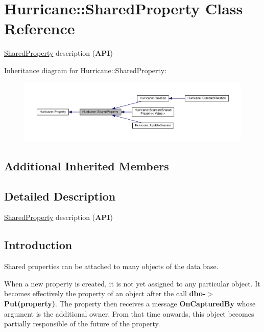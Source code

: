 \hypertarget{classHurricane_1_1SharedProperty}{\section{Hurricane\-:\-:Shared\-Property Class Reference}
\label{classHurricane_1_1SharedProperty}
}


\hyperlink{classHurricane_1_1SharedProperty}{Shared\-Property} description ({\bfseries A\-P\-I})  




Inheritance diagram for Hurricane\-:\-:Shared\-Property\-:\nopagebreak
\begin{figure}[H]
\begin{center}
\leavevmode
\includegraphics[width=350pt]{classHurricane_1_1SharedProperty__inherit__graph}
\end{center}
\end{figure}
\subsection*{Additional Inherited Members}


\subsection{Detailed Description}
\hyperlink{classHurricane_1_1SharedProperty}{Shared\-Property} description ({\bfseries A\-P\-I}) 

\hypertarget{classHurricane_1_1SharedProperty_secSharedPropertyIntro}{}\subsection{Introduction}\label{classHurricane_1_1SharedProperty_secSharedPropertyIntro}
Shared properties can be attached to many objects of the data base.

When a new property is created, it is not yet assigned to any particular object. It becomes effectively the property of an object after the call {\bfseries dbo-\/$>$Put(property)}. The property then receives a message {\bfseries On\-Captured\-By} whose argument is the additional owner. From that time onwards, this object becomes partially responsible of the future of the property.

